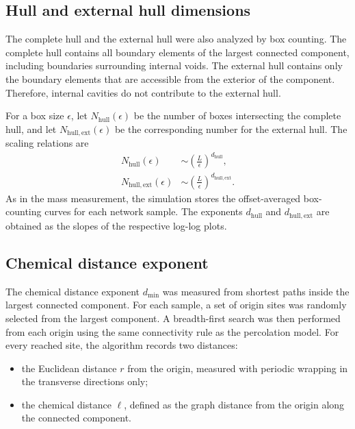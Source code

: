 \subsection{Hull and external hull dimensions}
\label{subsec:hull-dimensions}

The complete hull and the external hull were also analyzed by box counting.
The complete hull contains all boundary elements of the largest connected
component, including boundaries surrounding internal voids.  The external hull
contains only the boundary elements that are accessible from the exterior of
the component.  Therefore, internal cavities do not contribute to the external
hull.

For a box size \(\epsilon\), let \(N_{\mathrm{hull}}(\epsilon)\) be the number
of boxes intersecting the complete hull, and let
\(N_{\mathrm{hull,ext}}(\epsilon)\) be the corresponding number for the
external hull.  The scaling relations are
\begin{align}
    N_{\mathrm{hull}}(\epsilon)
    &\sim
    \left(\frac{L}{\epsilon}\right)^{d_{\mathrm{hull}}},
    \label{eq:dhull-box-counting}
    \\
    N_{\mathrm{hull,ext}}(\epsilon)
    &\sim
    \left(\frac{L}{\epsilon}\right)^{d_{\mathrm{hull,ext}}}.
    \label{eq:dhullext-box-counting}
\end{align}
As in the mass measurement, the simulation stores the offset-averaged
box-counting curves for each network sample.  The exponents
\(d_{\mathrm{hull}}\) and \(d_{\mathrm{hull,ext}}\) are obtained as the slopes
of the respective log-log plots.

\subsection{Chemical distance exponent}
\label{subsec:chemical-distance-exponent}

The chemical distance exponent \(d_{\min}\) was measured from shortest paths
inside the largest connected component.  For each sample, a set of origin sites
was randomly selected from the largest component.  A breadth-first search was
then performed from each origin using the same connectivity rule as the
percolation model.  For every reached site, the algorithm records two
distances:
\begin{itemize}
    \item the Euclidean distance \(r\) from the origin, measured with periodic
    wrapping in the transverse directions only;
    \item the chemical distance \(\ell\), defined as the graph distance from
    the origin along the connected component.
\end{itemize}

